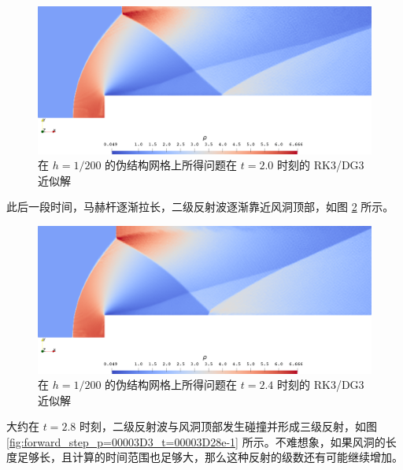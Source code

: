 \begin{figure}[h!]
\begin{centering}
\includegraphics[width=1\textwidth,height=0.28\textheight]{../mdpi/figures/forward_step/p=3_t=20e-1}
\par\end{centering}
\caption{\label{fig:forward_step_p=00003D3_t=00003D20e-1}在 $h=1/200$ 的伪结构网格上所得问题在
$t=2.0$ 时刻的 RK3/DG3 近似解}
\end{figure}

此后一段时间，马赫杆逐渐拉长，二级反射波逐渐靠近风洞顶部，如图 \ref{fig:forward_step_p=00003D3_t=00003D24e-1}
所示。

\begin{figure}[h!]
\begin{centering}
\includegraphics[width=1\textwidth,height=0.28\textheight]{../mdpi/figures/forward_step/p=3_t=24e-1}
\par\end{centering}
\caption{\label{fig:forward_step_p=00003D3_t=00003D24e-1}在 $h=1/200$ 的伪结构网格上所得问题在
$t=2.4$ 时刻的 RK3/DG3 近似解}
\end{figure}

大约在 $t=2.8$ 时刻，二级反射波与风洞顶部发生碰撞并形成三级反射，如图 \ref{fig:forward_step_p=00003D3_t=00003D28e-1}
所示。不难想象，如果风洞的长度足够长，且计算的时间范围也足够大，那么这种反射的级数还有可能继续增加。

